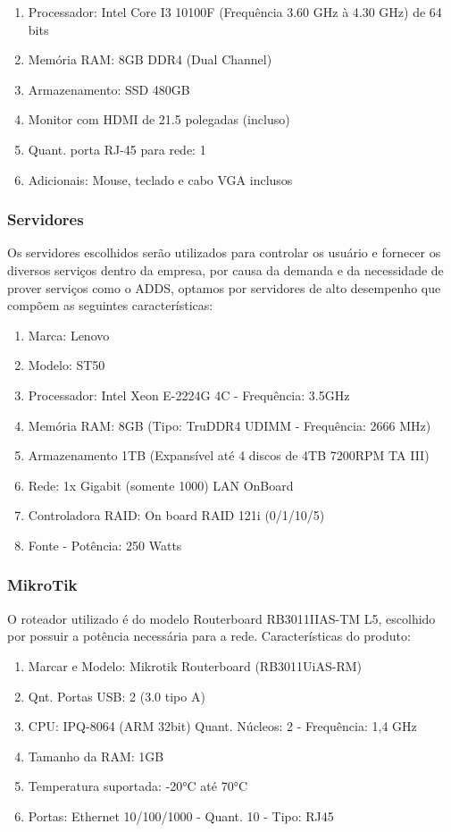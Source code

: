 \documentclass[12pt]{article}
\begin{document}
\begin{enumerate}
    \item Processador: Intel Core I3 10100F (Frequência 3.60 GHz à 4.30 GHz) de 64 bits
    \item Memória RAM: 8GB DDR4 (Dual Channel)
    \item Armazenamento: SSD 480GB
    \item Monitor com HDMI de 21.5 polegadas (incluso)
    \item Quant. porta RJ-45 para rede: 1
    \item Adicionais: Mouse, teclado e cabo VGA inclusos
\end{enumerate}

\subsubsection{Servidores}
Os servidores escolhidos serão utilizados para controlar os usuário e fornecer os diversos serviços dentro da empresa, por causa da demanda e da necessidade de prover serviços como o ADDS, optamos por servidores de alto desempenho que compõem as seguintes características:

\begin{enumerate}
    \item Marca: Lenovo
    \item Modelo: ST50
    \item Processador: Intel Xeon E-2224G 4C - Frequência: 3.5GHz
    \item Memória RAM: 8GB (Tipo: TruDDR4 UDIMM - Frequência: 2666 MHz)
    \item Armazenamento 1TB (Expansível até 4 discos de 4TB 7200RPM TA III)
    \item Rede: 1x Gigabit (somente 1000) LAN OnBoard
    \item Controladora RAID: On board RAID 121i (0/1/10/5)
    \item Fonte - Potência: 250 Watts
\end{enumerate}

\subsubsection{MikroTik}
O roteador utilizado é do modelo Routerboard RB3011IIAS-TM L5, escolhido por possuir a potência necessária para a rede. Características do produto:

\begin{enumerate}
    \item Marcar e Modelo: Mikrotik Routerboard (RB3011UiAS-RM)
    \item Qnt. Portas USB: 2 (3.0 tipo A)
    \item CPU: IPQ-8064 (ARM 32bit) Quant. Núcleos: 2 - Frequência: 1,4 GHz
    \item Tamanho da RAM: 1GB
    \item Temperatura suportada: -20°C até 70°C
    \item Portas: Ethernet 10/100/1000 - Quant. 10 - Tipo: RJ45
\end{enumerate}
\end{document}
